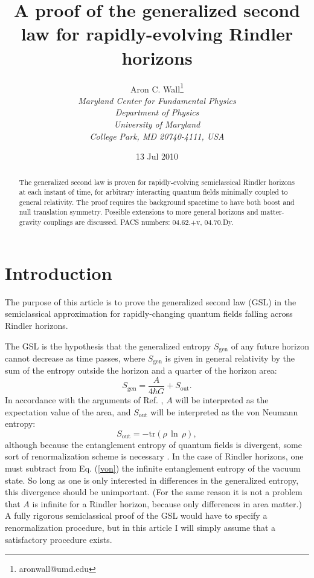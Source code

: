 \documentclass[12pt]{article}
\author{Aron C. Wall\footnote{aronwall@umd.edu}
\\ \textit{Maryland Center for Fundamental Physics} \\ \textit{Department of Physics} \\ \textit{University of Maryland} \\ \textit{College Park, MD 20740-4111, USA} }
\title{A proof of the generalized second law for rapidly-evolving Rindler horizons}
\date{13 Jul 2010}
\begin{document}
\maketitle

\begin{abstract}
The generalized second law is proven for rapidly-evolving semiclassical Rindler horizons at each instant of time, for arbitrary interacting quantum fields minimally coupled to general relativity.  The proof requires the background spacetime to have both boost and null translation symmetry.  Possible extensions to more general horizons and matter-gravity couplings are discussed.
\newline\newline
PACS numbers: 04.62.+v, 04.70.Dy.
\end{abstract}

\section{Introduction}\label{intro}

The purpose of this article is to prove the generalized second law (GSL) in the semiclassical approximation for rapidly-changing quantum fields falling across Rindler horizons.

The GSL is the hypothesis \cite{hawking75} that the generalized entropy $S_\mathrm{gen}$ of any future horizon cannot decrease as time passes, where $S_\mathrm{gen}$ is given in general relativity by the sum of the entropy outside the horizon and a quarter of the horizon area:
\begin{equation}\label{Gen}
S_\mathrm{gen} = \frac{A}{4 \hbar G} + S_\mathrm{out}.
\end{equation}
In accordance with the arguments of Ref. \cite{10proofs}, $A$ will be interpreted as the expectation value of the area, and $S_\mathrm{out}$ will be interpreted as the von Neumann entropy:
\begin{equation}\label{von}
S_\mathrm{out} = -\mathrm{tr}(\rho\,\ln\,\rho),
\end{equation}
although because the entanglement entropy of quantum fields is divergent, some sort of renormalization scheme is necessary \cite{jacobson94}.  In the case of Rindler horizons, one must subtract from Eq. (\ref{von}) the infinite entanglement entropy of the vacuum state.  So long as one is only interested in differences in the generalized entropy, this divergence should be unimportant.  (For the same reason it is not a problem that $A$ is infinite for a Rindler horizon, because only differences in area matter.)  A fully rigorous semiclassical proof of the GSL would have to specify a renormalization procedure, but in this article I will simply assume that a satisfactory procedure exists.
\end{document}

